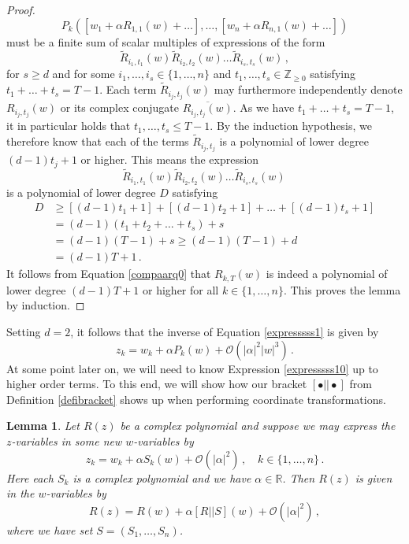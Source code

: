 \documentclass[12pt]{article}
\renewcommand{\mathcal}{\mathscr}
\theoremstyle{plain}
\newtheorem{lem}[thr]{Lemma}
\theoremstyle{definition}
\theoremstyle{remark}
\theoremstyle{remark}
\begin{document}
\begin{proof}
\[P_k([w_1 + \alpha R_{1,1}(w) + \dots], \dots, [w_n + \alpha R_{n,1}(w) + \dots]) \]
must be a finite sum of scalar multiples of expressions of the form
\[ \tilde{R}_{i_1,t_1}(w)\tilde{R}_{i_2,t_2}(w) \dots \tilde{R}_{i_s,t_s}(w) \, , \]
for $s \geq d$ and for some $i_1, \dots, i_s \in \{1, \dots, n\}$ and $t_1, \dots, t_s \in \mathbb{Z}_{\geq 0}$ satisfying $t_1 + \dots + t_s = T-1$. Each term $\tilde{R}_{i_j,t_j}(w)$ may furthermore independently denote ${R}_{i_j,t_j}(w)$ or its complex conjugate $\overline{R_{i_j,t_j}(w)}$. As we have $t_1 + \dots + t_s = T-1$, it in particular holds that $t_1, \dots, t_s \leq T-1$. By the induction hypothesis, we therefore know that each of the terms $\tilde{R}_{i_j,t_j}$ is a polynomial of lower degree $(d-1)t_j + 1$ or higher. This means the expression
\[ \tilde{R}_{i_1,t_1}(w)\tilde{R}_{i_2,t_2}(w) \dots \tilde{R}_{i_s,t_s}(w) \,  \]
is a polynomial of lower degree $D$ satisfying
\begin{align}
  D &\geq  [(d-1)t_1 + 1] + [(d-1)t_2 + 1] + \dots + [(d-1)t_s + 1] \nonumber \\ \nonumber
    &= (d-1)(t_1 + t_2 + \dots + t_s) + s \\ \nonumber
    &= (d-1)(T-1) + s \geq  (d-1)(T-1) + d   \\ \nonumber
    &=(d-1)T + 1 \, .
\end{align}
It follows from Equation \eqref{compaarq0} that $R_{k,T}(w)$ is indeed a polynomial of lower degree $(d-1)T + 1$ or higher for all $k \in \{1, \dots, n\}$. This proves the lemma by induction.
\end{proof}
\noindent Setting $d=2$, it follows that the inverse of Equation \eqref{expresssss1} is given by 
\begin{equation}\label{expresssss10}
z_k = w_k + \alpha P_k(w) + \mathcal{O}(|\alpha|^2|w|^3) \, .
\end{equation}
At some point later on, we will need to know Expression \eqref{expresssss10} up to higher order terms. To this end, we will show how our bracket $[\bullet|| \bullet]$ from Definition \ref{defibracket} shows up when performing coordinate transformations.

\begin{lem}\label{useful1}
Let $R(z)$ be a complex polynomial and suppose we may express the $z$-variables in some new $w$-variables by 
\begin{equation}\label{plugin234}
    z_k = w_k + \alpha S_k(w) + \mathcal{O}(|\alpha|^2) \, , \quad k \in \{1, \dots, n\} \, .
\end{equation}
Here each $S_k$ is a complex polynomial and we have $\alpha \in \mathbb{R}$. Then $R(z)$ is given in the $w$-variables by
\begin{equation}\label{transfff123}
R(z) = R(w) + \alpha[R||S](w) +  \mathcal{O}(|\alpha|^2) \, ,
\end{equation}
where we have set $S = (S_1, \dots, S_n)$.
\end{lem}
\end{document}
